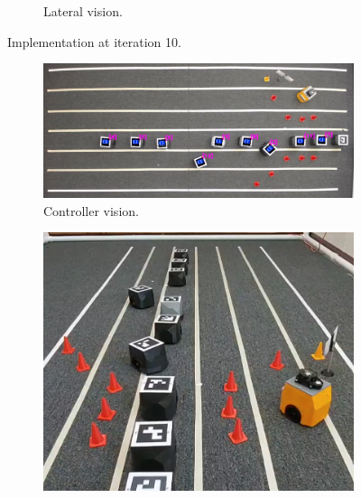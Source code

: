 \begin{appendix}
\begin{figure}[H]
\begin{subfigure}[b]{0.50\textwidth}
    \caption{Lateral vision.}
    \label{fig:third}
\end{subfigure}
\caption{Implementation at iteration 10.}
\label{fig:figures}
\end{figure}





\begin{figure}[H]
\centering
\begin{subfigure}[t]{\textwidth}
    \includegraphics[width=\textwidth]{Anexos/red_lane/red_lane_it40_cam0.png}
    \caption{Controller vision.}
    \label{fig:first}
\end{subfigure}
\vspace{1cm}
\begin{subfigure}[b]{0.4\textwidth}
    \includegraphics[width=\textwidth]{Anexos/red_lane/red_lane_it40_cam1.png}

\end{subfigure}
\end{figure}
\end{appendix}
